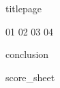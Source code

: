 \documentclass[a4paper,12pt]{article}
\begin{document}
{titlepage}
\clearpage
  \setcounter{page}{2}
  \tableofcontents
\clearpage

{01}
{02}
{03}
{04}

\clearpage
  {conclusion}
\clearpage

\clearpage
  {score_sheet}
\clearpage
\end{document}
